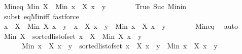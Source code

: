 \begin{isabellebody}
\ Min{\isacharunderscore}{\kern0pt}eq{\isacharcolon}{\kern0pt}\ {\isachardoublequoteopen}Min\ X\ {\isacharequal}{\kern0pt}\ Min\ {\isacharbraceleft}{\kern0pt}x\ {\isasymin}\ X{\isachardot}{\kern0pt}\ x\ {\isacharless}{\kern0pt}\ y{\isacharbraceright}{\kern0pt}{\isachardoublequoteclose}\isanewline
\ \ \ \ \ \ \isamarkupfalse%
\ True\ Suc\ Min{\isacharunderscore}{\kern0pt}in\isanewline
\ \ \ \ \ \ \isamarkupfalse%
\ {\isacharparenleft}{\kern0pt}subst\ eq{\isacharunderscore}{\kern0pt}Min{\isacharunderscore}{\kern0pt}iff{\isacharparenright}{\kern0pt}\ fastforce{\isacharplus}{\kern0pt}\isanewline
\ \ \ \ \isamarkupfalse%
\ {\isachardoublequoteopen}{\isacharbraceleft}{\kern0pt}x\ {\isasymin}\ {\isacharparenleft}{\kern0pt}X\ {\isacharminus}{\kern0pt}\ {\isacharbraceleft}{\kern0pt}Min\ X{\isacharbraceright}{\kern0pt}{\isacharparenright}{\kern0pt}{\isachardot}{\kern0pt}\ x\ {\isacharless}{\kern0pt}\ y{\isacharbraceright}{\kern0pt}\ {\isacharequal}{\kern0pt}\ {\isacharbraceleft}{\kern0pt}x\ {\isasymin}\ X{\isachardot}{\kern0pt}\ x\ {\isacharless}{\kern0pt}\ y{\isacharbraceright}{\kern0pt}\ {\isacharminus}{\kern0pt}\ {\isacharbraceleft}{\kern0pt}Min\ {\isacharbraceleft}{\kern0pt}x\ {\isasymin}\ X{\isachardot}{\kern0pt}\ x\ {\isacharless}{\kern0pt}\ y{\isacharbraceright}{\kern0pt}{\isacharbraceright}{\kern0pt}{\isachardoublequoteclose}\isanewline
\ \ \ \ \ \ \isamarkupfalse%
\ Min{\isacharunderscore}{\kern0pt}eq\ \isamarkupfalse%
\ auto\isanewline
\ \ \ \ \isamarkupfalse%
\ {\isachardoublequoteopen}Min\ X\ {\isacharhash}{\kern0pt}\ sorted{\isacharunderscore}{\kern0pt}list{\isacharunderscore}{\kern0pt}of{\isacharunderscore}{\kern0pt}set\ {\isacharbraceleft}{\kern0pt}x\ {\isasymin}\ {\isacharparenleft}{\kern0pt}X\ {\isacharminus}{\kern0pt}\ {\isacharbraceleft}{\kern0pt}Min\ X{\isacharbraceright}{\kern0pt}{\isacharparenright}{\kern0pt}{\isachardot}{\kern0pt}\ x\ {\isacharless}{\kern0pt}\ y{\isacharbraceright}{\kern0pt}\ {\isacharequal}{\kern0pt}\ \isanewline
\ \ \ \ \ \ Min\ {\isacharbraceleft}{\kern0pt}x\ {\isasymin}\ X{\isachardot}{\kern0pt}\ x\ {\isacharless}{\kern0pt}\ y{\isacharbraceright}{\kern0pt}\ {\isacharhash}{\kern0pt}\ sorted{\isacharunderscore}{\kern0pt}list{\isacharunderscore}{\kern0pt}of{\isacharunderscore}{\kern0pt}set\ {\isacharparenleft}{\kern0pt}{\isacharbraceleft}{\kern0pt}x\ {\isasymin}\ X{\isachardot}{\kern0pt}\ x\ {\isacharless}{\kern0pt}\ y{\isacharbraceright}{\kern0pt}\ {\isacharminus}{\kern0pt}\ {\isacharbraceleft}{\kern0pt}Min\ {\isacharbraceleft}{\kern0pt}x\ {\isasymin}\ X{\isachardot}{\kern0pt}\ x\ {\isacharless}{\kern0pt}\ y{\isacharbraceright}{\kern0pt}{\isacharbraceright}{\kern0pt}{\isacharparenright}{\kern0pt}{\isachardoublequoteclose}\isanewline

\end{isabellebody}

